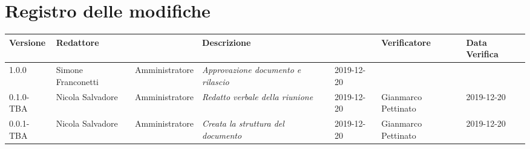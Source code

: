 \section*{Registro delle modifiche}
\renewcommand{\arraystretch}{1.8}
  \setlength\LTleft{-1.7cm}
  \begin{longtable}{|p{1.7cm}|p{2cm}|p{2.5cm}|p{3cm}|p{1.7cm}|p{2cm}|p{2.3cm}|}
    \hline
    \rowcolor{header}
    \textbf{Versione} & \textbf{Redattore} & \centering{\textbf{Ruolo}} & \textbf{Descrizione} &      \centering{\textbf{Data}} & \textbf{Verificatore} & \textbf{Data Verifica} \\
    \hline
    1.0.0 & Simone Franconetti & Amministratore & \small{\textit{Approvazione documento e rilascio}} & 2019-12-20 & & \\
    0.1.0-TBA & Nicola Salvadore & Amministratore & \small{\textit{Redatto verbale della riunione}} & 2019-12-20 & Gianmarco Pettinato & 2019-12-20 \\
    0.0.1-TBA & Nicola Salvadore & Amministratore & \small{\textit{Creata la struttura del documento}} & 2019-12-20 & Gianmarco Pettinato & 2019-12-20 \\

    \hline
  \end{longtable}
  \setlength\LTleft{0cm}
